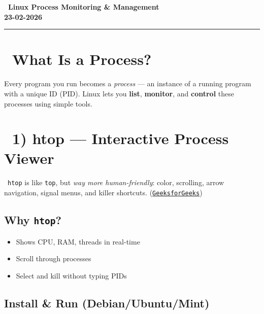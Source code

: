 \documentclass[12pt]{article}
\newcommand{\courseTitle}{Linux Process Monitoring \& Management}
\newcommand{\courseDate}{23-02-2026}
\newcommand{\penguinicon}{\faLinux}
\newcommand{\htopicon}{\faChartLine}
\begin{document}
\begin{center}
\headingfont\Huge\bfseries\color{navy}
\penguinicon\ \courseTitle\\[0.5em]
\Large\color{teamred}
\courseDate
\end{center}

\vspace{1em}
\begin{center}
\color{teamred}\rule{0.8\textwidth}{1pt}
\end{center}

\section*{\faInfoCircle\ What Is a Process?}

Every program you run becomes a \textit{process} — an instance of a running program with a unique ID (PID). Linux lets you \textbf{list}, \textbf{monitor}, and \textbf{control} these processes using simple tools.

\section*{\htopicon\ 1) \textbf{htop — Interactive Process Viewer}}

\begin{infobox}
\faLightbulb\ \texttt{htop} is like \texttt{top}, but \textit{way more human-friendly}: color, scrolling, arrow navigation, signal menus, and killer shortcuts. (\href{https://www.geeksforgeeks.org/linux-unix/using-htop-to-monitor-system-processes-on-linux/}{\texttt{GeeksforGeeks}})
\end{infobox}

\subsection*{Why \texttt{htop}?}

\begin{itemize}
    \item Shows CPU, RAM, threads in real-time
    \item Scroll through processes
    \item Select and kill without typing PIDs
\end{itemize}

\subsection*{Install \& Run (Debian/Ubuntu/Mint)}
\end{document}
